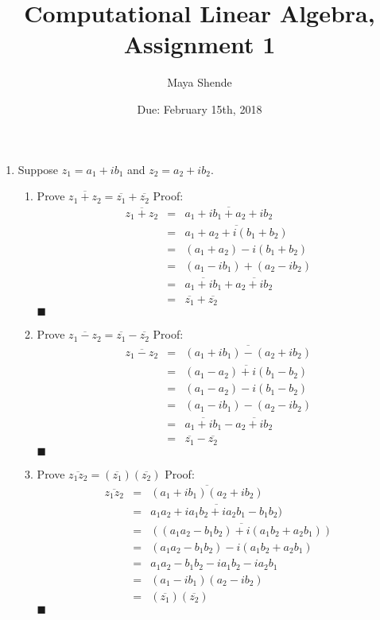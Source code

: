 \documentclass{article}
\title{Computational Linear Algebra, Assignment 1}
\author{Maya Shende}
\date{Due: February 15th, 2018}
\newcommand*{\qed}{\hfill\ensuremath{\blacksquare}}
\begin{document}
\maketitle

\begin{enumerate}
	
	\item Suppose $z_1 = a_1 + ib_1$ and $z_2 = a_2 + ib_2$. 
	\begin{enumerate}
		
		\item Prove $\overline{z_1+z_2} = \overline{z_1} + \overline{z_2}$
			Proof: 
			\begin{eqnarray*}
				\overline{z_1+z_2} &=&\overline{a_1+ib_1 + a_2+ib_2}\\
				&=& \overline{a_1+a_2+i(b_1+b_2)}\\
				&=& (a_1+a_2) - i(b_1+b_2)\\
				&=& (a_1 - ib_1) + (a_2 - ib_2)\\
				&=& \overline{a_1+ib_1} + \overline{a_2+ib_2}\\
				&=& \overline{z_1} + \overline{z_2}
			\end{eqnarray*}
			 \qed
		\item Prove $\overline{z_1-z_2} = \overline{z_1} - \overline{z_2}$
			Proof: 
			\begin{eqnarray*}
				\overline{z_1-z_2} &=&\overline{(a_1+ib_1) - (a_2+ib_2)}\\
				&=& \overline{(a_1-a_2)+i(b_1-b_2)}\\
				&=& (a_1-a_2) - i(b_1-b_2)\\
				&=& (a_1 - ib_1) - (a_2 - ib_2)\\
				&=& \overline{a_1+ib_1} - \overline{a_2+ib_2}\\
				&=& \overline{z_1} - \overline{z_2}
			\end{eqnarray*}
			 \qed
			 
		\item Prove $\overline{z_1z_2} = (\overline{z_1} )(\overline{z_2})$
			Proof: 
			\begin{eqnarray*}
				\overline{z_1z_2} &=&\overline{(a_1+ib_1) (a_2+ib_2)}\\
				&=& \overline{a_1a_2 + ia_1b_2 + ia_2b_1 - b_1b_2)}\\
				&=& \overline{((a_1a_2 - b_1b_2) + i(a_1b_2+a_2b_1))}\\
				&=& (a_1a_2 - b_1b_2) - i(a_1b_2+a_2b_1) \\
				&=& a_1a_2-b_1b_2-ia_1b_2-ia_2b_1\\
				&=& (a_1-ib_1)(a_2-ib_2)\\
				&=& (\overline{z_1})(\overline{z_2})
			\end{eqnarray*}
			 \qed

	\end{enumerate}
\end{enumerate}
\end{document}
